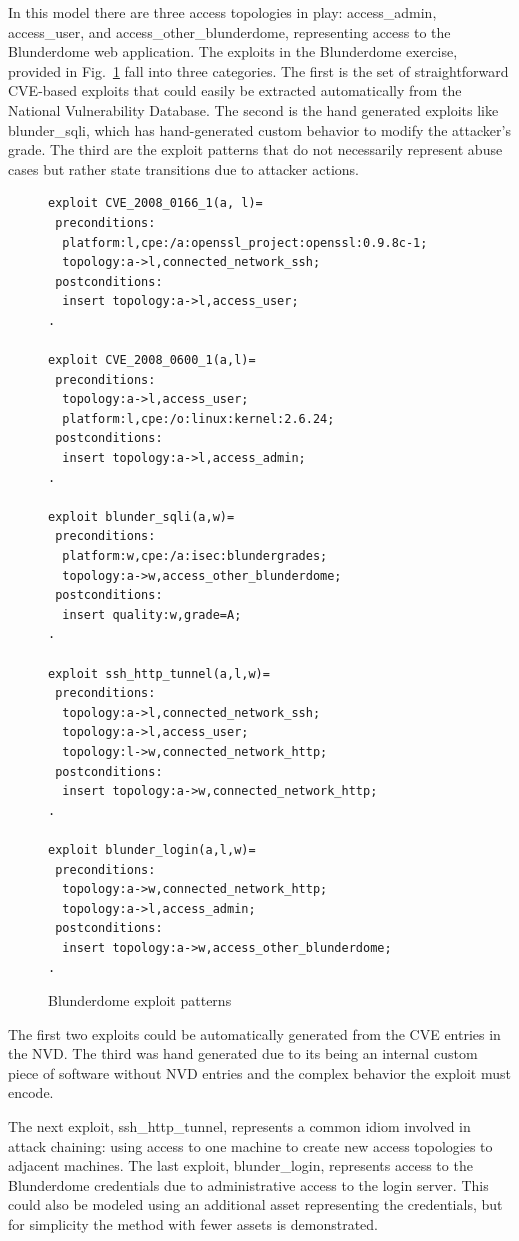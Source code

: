 In this model there are three access topologies in play: access\_admin,
access\_user, and access\_other\_blunderdome, representing access to the 
Blunderdome web application.
The exploits in the Blunderdome exercise, provided in Fig.~\ref{fig:blunder_xp}
fall into three categories. The first is the set of straightforward CVE-based exploits
that could easily be extracted automatically from the National Vulnerability
Database. The second is the hand generated exploits like blunder\_sqli, which
has hand-generated custom behavior to modify the attacker's grade. The third
are the exploit patterns that do not necessarily represent abuse cases 
but rather state transitions due to attacker actions.

\begin{figure}
\begin{lstlisting}
exploit CVE_2008_0166_1(a, l)=
 preconditions:
  platform:l,cpe:/a:openssl_project:openssl:0.9.8c-1;
  topology:a->l,connected_network_ssh;
 postconditions:
  insert topology:a->l,access_user;
.

exploit CVE_2008_0600_1(a,l)=
 preconditions:
  topology:a->l,access_user;
  platform:l,cpe:/o:linux:kernel:2.6.24;
 postconditions:
  insert topology:a->l,access_admin;
.

exploit blunder_sqli(a,w)=
 preconditions:
  platform:w,cpe:/a:isec:blundergrades;
  topology:a->w,access_other_blunderdome;
 postconditions:
  insert quality:w,grade=A;
.

exploit ssh_http_tunnel(a,l,w)=
 preconditions:
  topology:a->l,connected_network_ssh;
  topology:a->l,access_user;
  topology:l->w,connected_network_http;
 postconditions:
  insert topology:a->w,connected_network_http;
.

exploit blunder_login(a,l,w)=
 preconditions:
  topology:a->w,connected_network_http;
  topology:a->l,access_admin;
 postconditions:
  insert topology:a->w,access_other_blunderdome;
.
\end{lstlisting}
\caption{Blunderdome exploit patterns}
\label{fig:blunder_xp}
\end{figure}

The first two exploits could be automatically generated from the CVE entries
in the NVD. The third was hand generated due to its being an internal custom 
piece of software without NVD entries and the complex behavior the exploit must
encode.

The next exploit, ssh\_http\_tunnel, represents a common idiom involved in
attack chaining: using access to one machine to create new access topologies
to adjacent machines. The last exploit, blunder\_login, represents access to
the Blunderdome credentials due to administrative access to the login
server. This could also be modeled using an additional asset representing the
credentials, but for simplicity the method with fewer assets is demonstrated.

